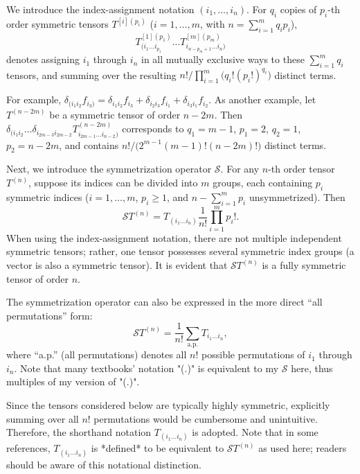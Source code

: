 \documentclass{article}
\begin{document}
We introduce the index-assignment notation $(i_1, \dots, i_n)$.  
For $q_i$ copies of $p_i$-th order symmetric tensors $T^{[i](p_i)}$ ($i = 1, \dots, m$, with $n = \sum_{i=1}^m q_i p_i$),
\[
T^{[1](p_1)}_{(i_1 \dots i_{p_1}} \dots T^{[m](p_m)}_{i_{n-p_m+1} \dots i_n)}
\]
denotes assigning $i_1$ through $i_n$ in all mutually exclusive ways to these $\sum_{i=1}^m q_i$ tensors, and summing over the resulting 
$n!/\!\prod_{i=1}^m \!\big(q_i! (p_i!)^{q_i}\big)$ distinct terms.

For example, $\delta_{(i_1 i_2} f_{i_3)} = \delta_{i_1 i_2} f_{i_3} + \delta_{i_2 i_3} f_{i_1} + \delta_{i_3 i_1} f_{i_2}$.  
As another example, let $T^{(n-2m)}$ be a symmetric tensor of order $n-2m$. Then  
$\delta_{(i_1 i_2} \dots \delta_{i_{2m-3} i_{2m-2}} T^{(n-2m)}_{i_{2m-1} \dots i_{n-2})}$  
corresponds to $q_1 = m-1$, $p_1 = 2$, $q_2 = 1$, $p_2 = n-2m$, and contains  
$n!/\!\big(2^{m-1} (m-1)! (n-2m)!\big)$ distinct terms.

\medskip
Next, we introduce the symmetrization operator $\mathcal{S}$.  
For any $n$-th order tensor $T^{(n)}$, suppose its indices can be divided into $m$ groups, each containing $p_i$ symmetric indices 
($i = 1, \dots, m$, $p_i \ge 1$, and $n - \sum_{i=1}^m p_i$ unsymmetrized). Then
\[
\mathcal{S} T^{(n)} = T_{(i_1 \dots i_n)} \frac{1}{n!} \prod_{i=1}^m p_i!.
\]
When using the index-assignment notation, there are not multiple independent symmetric tensors; rather, one tensor possesses several symmetric index groups (a vector is also a symmetric tensor).  
It is evident that $\mathcal{S}T^{(n)}$ is a fully symmetric tensor of order $n$.

\medskip
The symmetrization operator can also be expressed in the more direct “all permutations” form:
\[
\mathcal{S} T^{(n)} = \frac{1}{n!} \sum_{\text{a.p.}} T_{i_1 \dots i_n},
\]
where “a.p.” (all permutations) denotes all $n!$ possible permutations of $i_1$ through $i_n$. Note that many textbooks' notation "(.)" is equivalent to my $\mathcal{S}$ here, thus multiples of my version of "(.)". 

Since the tensors considered below are typically highly symmetric, explicitly summing over all $n!$ permutations would be cumbersome and unintuitive. Therefore, the shorthand notation $T_{(i_1 \dots i_n)}$ is adopted.  
Note that in some references, $T_{(i_1 \dots i_n)}$ is *defined* to be equivalent to $\mathcal{S}T^{(n)}$ as used here; readers should be aware of this notational distinction.
\end{document}
